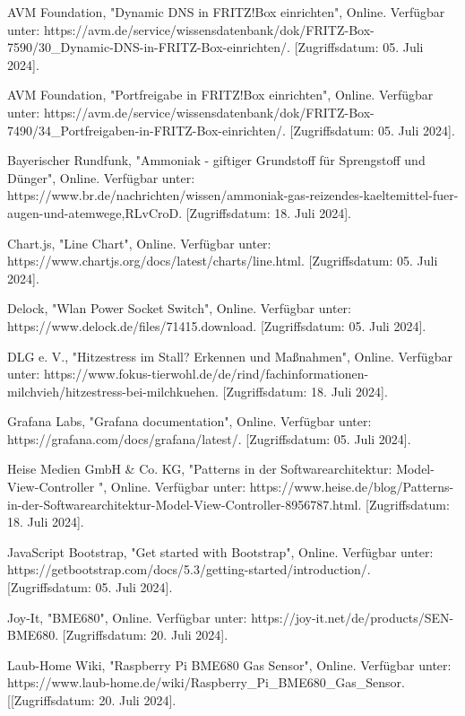 \documentclass[conference]{IEEEtran}
\begin{document}
\begin{thebibliography}{00}

AVM Foundation, "Dynamic DNS in FRITZ!Box einrichten", Online. Verfügbar unter: https://avm.de/service/wissensdatenbank/dok/FRITZ-Box-7590/30\_Dynamic-DNS-in-FRITZ-Box-einrichten/. [Zugriffsdatum: 05. Juli 2024].

AVM Foundation, "Portfreigabe in FRITZ!Box einrichten", Online. Verfügbar unter: https://avm.de/service/wissensdatenbank/dok/FRITZ-Box-7490/34\_Portfreigaben-in-FRITZ-Box-einrichten/. [Zugriffsdatum: 05. Juli 2024].

Bayerischer Rundfunk, "Ammoniak - giftiger Grundstoff für Sprengstoff und Dünger", Online. Verfügbar unter: https://www.br.de/nachrichten/wissen/ammoniak-gas-reizendes-kaeltemittel-fuer-augen-und-atemwege,RLvCroD. [Zugriffsdatum: 18. Juli 2024].

Chart.js, "Line Chart", Online. Verfügbar unter: https://www.chartjs.org/docs/latest/charts/line.html. [Zugriffsdatum: 05. Juli 2024].

Delock, "Wlan Power Socket Switch", Online. Verfügbar unter: https://www.delock.de/files/71415.download. [Zugriffsdatum: 05. Juli 2024].

DLG e. V., "Hitzestress im Stall? Erkennen und Maßnahmen", Online. Verfügbar unter: https://www.fokus-tierwohl.de/de/rind/fachinformationen-milchvieh/hitzestress-bei-milchkuehen. [Zugriffsdatum: 18. Juli 2024].

Grafana Labs, "Grafana documentation", Online. Verfügbar unter: https://grafana.com/docs/grafana/latest/. [Zugriffsdatum: 05. Juli 2024].

Heise Medien GmbH \& Co. KG, "Patterns in der Softwarearchitektur: Model-View-Controller ", Online. Verfügbar unter: https://www.heise.de/blog/Patterns-in-der-Softwarearchitektur-Model-View-Controller-8956787.html. [Zugriffsdatum: 18. Juli 2024].

JavaScript Bootstrap, "Get started with Bootstrap", Online. Verfügbar unter: https://getbootstrap.com/docs/5.3/getting-started/introduction/. [Zugriffsdatum: 05. Juli 2024].

Joy-It, "BME680", Online. Verfügbar unter: https://joy-it.net/de/products/SEN-BME680. [Zugriffsdatum: 20. Juli 2024].

Laub-Home Wiki, "Raspberry Pi BME680 Gas Sensor", Online. Verfügbar unter: https://www.laub-home.de/wiki/Raspberry\_Pi\_BME680\_Gas\_Sensor. [[Zugriffsdatum: 20. Juli 2024].


\end{thebibliography}
\end{document}
